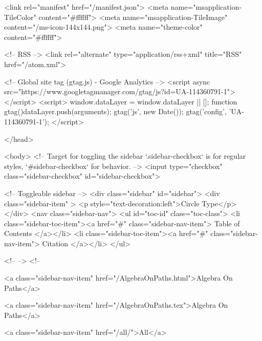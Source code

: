   <link rel="manifest" href="/manifest.json">
  <meta name="msapplication-TileColor" content="#ffffff">
  <meta name="msapplication-TileImage" content="/ms-icon-144x144.png">
  <meta name="theme-color" content="#ffffff">
  
  <!-- RSS -->
  <link rel="alternate" type="application/rss+xml" title="RSS" href="/atom.xml">

  <!-- Global site tag (gtag.js) - Google Analytics -->
  <script async src="https://www.googletagmanager.com/gtag/js?id=UA-114360791-1"></script>
  <script>
    window.dataLayer = window.dataLayer || [];
    function gtag(){dataLayer.push(arguments);}
    gtag('js', new Date());
    gtag('config', 'UA-114360791-1');
  </script>

  
</head>




  <body>
    <!-- Target for toggling the sidebar `.sidebar-checkbox` is for regular
     styles, `#sidebar-checkbox` for behavior. -->
<input type="checkbox" class="sidebar-checkbox" id="sidebar-checkbox">

<!-- Toggleable sidebar -->
<div class="sidebar" id="sidebar">
  <div class="sidebar-item" >
    <p style="text-decoration:left">Circle Type</p>
  </div>
  <nav class="sidebar-nav">
    <ul id="toc-id" class="toc-class">
  <li class="sidebar-toc-item"><a href="#" class="sidebar-nav-item"> Table of Contents </a></li>
  <li class="sidebar-toc-item"><a href="#" class="sidebar-nav-item"> Citation </a></li>
</ul>


    <!--  -->
    <!-- 
      
    
      
    
      
    
      
        
      
    
      
        
          <a class="sidebar-nav-item" href="/AlgebraOnPaths.html">Algebra On Paths</a>
        
      
    
      
        
          <a class="sidebar-nav-item" href="/AlgebraOnPaths.tex">Algebra On Paths</a>
        
      
    
      
        
          <a class="sidebar-nav-item" href="/all/">All</a>
        
      
    
      
        
